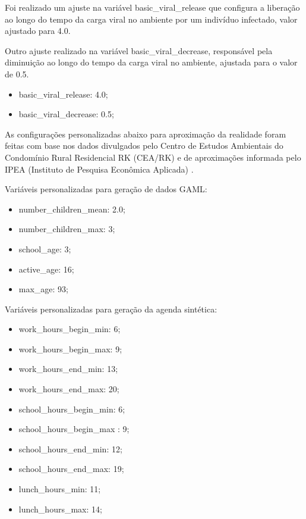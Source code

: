 Foi realizado um ajuste na variável basic\_viral\_release que configura a liberação ao longo do tempo da carga viral no ambiente por um indivíduo infectado, valor ajustado para 4.0.

Outro ajuste realizado na variável basic\_viral\_decrease, responsável pela diminuição ao longo do tempo da carga viral no ambiente, ajustada para o valor de 0.5.

\begin{itemize}
\item basic\_viral\_release: 4.0;
\item basic\_viral\_decrease: 0.5;
\end{itemize}

As configurações personalizadas abaixo para aproximação da realidade foram feitas com base nos dados divulgados pelo Centro de Estudos Ambientais do Condomínio Rural Residencial RK (CEA/RK) e de aproximações informada pelo IPEA (Instituto de Pesquisa Econômica Aplicada) \cite{IPEA:online}.

Variáveis personalizadas para geração de dados GAML:

\begin{itemize}
\item number\_children\_mean: 2.0;
\item number\_children\_max: 3;
\item school\_age: 3;
\item active\_age: 16;
\item max\_age: 93;
\end{itemize}


Variáveis personalizadas para geração da agenda sintética:

\begin{itemize}
\item work\_hours\_begin\_min: 6;
\item work\_hours\_begin\_max: 9;
\item work\_hours\_end\_min: 13; 
\item work\_hours\_end\_max: 20;
\item school\_hours\_begin\_min: 6;
\item school\_hours\_begin\_max : 9;
\item school\_hours\_end\_min: 12;
\item school\_hours\_end\_max: 19;
\item lunch\_hours\_min: 11;
\item lunch\_hours\_max: 14;
\end{itemize}


